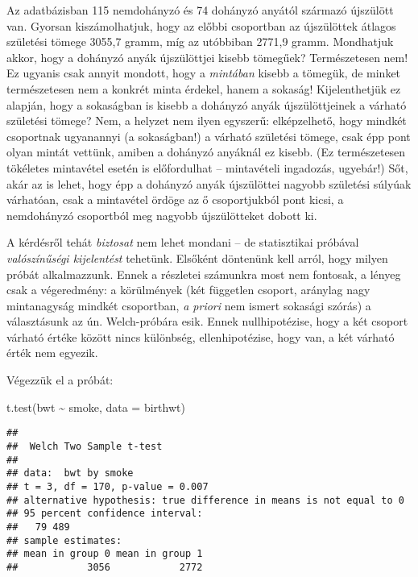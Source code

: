 \documentclass[
]{book}
\newenvironment{Shaded}{\begin{snugshade}}{\end{snugshade}}
\newcommand{\AttributeTok}[1]{\textcolor[rgb]{0.77,0.63,0.00}{#1}}
\newcommand{\FunctionTok}[1]{\textcolor[rgb]{0.00,0.00,0.00}{#1}}
\newcommand{\NormalTok}[1]{#1}
\newcommand{\SpecialCharTok}[1]{\textcolor[rgb]{0.00,0.00,0.00}{#1}}
\begin{document}
Az adatbázisban 115 nemdohányzó és 74 dohányzó anyától származó újszülött van. Gyorsan kiszámolhatjuk, hogy az előbbi csoportban az újszülöttek átlagos születési tömege 3055,7 gramm, míg az utóbbiban 2771,9 gramm. Mondhatjuk akkor, hogy a dohányzó anyák újszülöttjei kisebb tömegűek? Természetesen nem! Ez ugyanis csak annyit mondott, hogy a \emph{mintában} kisebb a tömegük, de minket természetesen nem a konkrét minta érdekel, hanem a sokaság! Kijelenthetjük ez alapján, hogy a sokaságban is kisebb a dohányzó anyák újszülöttjeinek a várható születési tömege? Nem, a helyzet nem ilyen egyszerű: elképzelhető, hogy mindkét csoportnak ugyanannyi (a sokaságban!) a várható születési tömege, csak épp pont olyan mintát vettünk, amiben a dohányzó anyáknál ez kisebb. (Ez természetesen tökéletes mintavétel esetén is előfordulhat -- mintavételi ingadozás, ugyebár!) Sőt, akár az is lehet, hogy épp a dohányzó anyák újszülöttei nagyobb születési súlyúak várhatóan, csak a mintavétel ördöge az ő csoportjukból pont kicsi, a nemdohányzó csoportból meg nagyobb újszülötteket dobott ki.

A kérdésről tehát \emph{biztosat} nem lehet mondani -- de statisztikai próbával \emph{valószínűségi kijelentést} tehetünk. Elsőként döntenünk kell arról, hogy milyen próbát alkalmazzunk. Ennek a részletei számunkra most nem fontosak, a lényeg csak a végeredmény: a körülmények (két független csoport, aránylag nagy mintanagyság mindkét csoportban, \emph{a priori} nem ismert sokasági szórás) a választásunk az ún. Welch-próbára esik. Ennek nullhipotézise, hogy a két csoport várható értéke között nincs különbség, ellenhipotézise, hogy van, a két várható érték nem egyezik.

Végezzük el a próbát:

\begin{Shaded}
\begin{Highlighting}[]
\FunctionTok{t.test}\NormalTok{(bwt }\SpecialCharTok{\textasciitilde{}}\NormalTok{ smoke, }\AttributeTok{data =}\NormalTok{ birthwt)}
\end{Highlighting}
\end{Shaded}

\begin{verbatim}
## 
##  Welch Two Sample t-test
## 
## data:  bwt by smoke
## t = 3, df = 170, p-value = 0.007
## alternative hypothesis: true difference in means is not equal to 0
## 95 percent confidence interval:
##   79 489
## sample estimates:
## mean in group 0 mean in group 1 
##            3056            2772
\end{verbatim}
\end{document}
